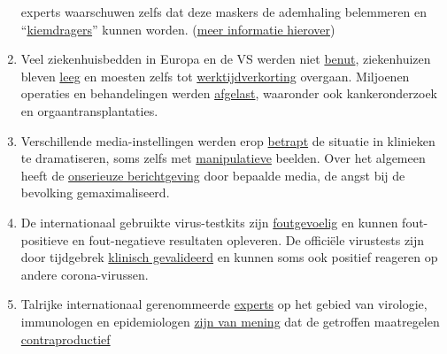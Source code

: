 \begin{enumerate}
  experts waarschuwen zelfs dat deze maskers de ademhaling belemmeren en
  ``\href{https://de.sputniknews.com/interviews/20200425326953541-corona-gefahr-virologe/}{kiemdragers}''
  kunnen worden.
  (\href{https://www.cidrap.umn.edu/news-perspective/2020/04/commentary-masks-all-covid-19-not-based-sound-data}{meer
  informatie hierover})
\item
  Veel ziekenhuisbedden in Europa en de VS werden niet
  \href{https://www.usatoday.com/story/news/health/2020/04/02/coronavirus-pandemic-jobs-us-health-care-workers-furloughed-laid-off/5102320002/}{benut},
  ziekenhuizen bleven
  \href{https://www.spiegel.de/wirtschaft/unternehmen/trotz-corona-pandemie-warum-kliniken-jetzt-kurzarbeit-anmelden-a-3dc61bc9-fb12-4298-8022-bb4c2be39d7d}{leeg}
  en moesten zelfs tot
  \href{https://www.20min.ch/schweiz/news/story/Spitaeler-28949526}{werktijdverkorting}
  overgaan. Miljoenen operaties en behandelingen werden
  \href{https://www.birmingham.ac.uk/news/latest/2020/05/covid-disruption-28-million-surgeries-cancelled.aspx}{afgelast},
  waaronder ook kankeronderzoek en orgaantransplantaties.
\item
  Verschillende media-instellingen werden erop
  \href{https://nypost.com/2020/04/01/cbs-admits-to-using-footage-from-italy-in-report-about-nyc/}{betrapt}
  de situatie in klinieken te dramatiseren, soms zelfs met
  \href{https://www.wsj.com/articles/cbs-says-fake-news-wasnt-theirs-11588789238}{manipulatieve}
  beelden. Over het algemeen heeft de
  \href{https://www.infosperber.ch/Artikel/Medien/Corona-Medien-verbreiten-weiter-unbeirrt-statistischen-Unsinn}{onserieuze
  berichtgeving} door bepaalde media, de angst bij de bevolking
  gemaximaliseerd.
\item
  De internationaal gebruikte virus-testkits zijn
  \href{https://www.ncbi.nlm.nih.gov/pubmed/32219885}{foutgevoelig} en
  kunnen fout-positieve en fout-negatieve resultaten opleveren. De
  officiële virustests zijn door tijdgebrek
  \href{https://www.youtube.com/watch?v=p_AyuhbnPOI}{klinisch
  gevalideerd} en kunnen soms ook positief reageren op andere
  corona-virussen.
\item
  Talrijke internationaal gerenommeerde
  \href{https://www.rubikon.news/artikel/120-expertenstimmen-zu-corona}{experts}
  op het gebied van virologie, immunologen en epidemiologen
  \href{https://off-guardian.org/2020/03/24/12-experts-questioning-the-coronavirus-panic/}{zijn
  van mening} dat de getroffen maatregelen
  \href{https://off-guardian.org/2020/03/28/10-more-experts-criticising-the-coronavirus-panic/}{contraproductief}

\end{enumerate}
